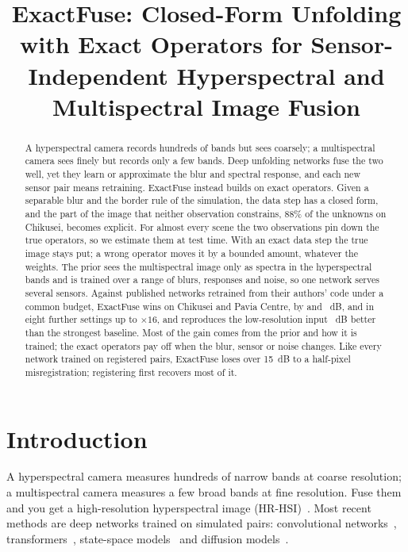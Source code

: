 \documentclass[10pt,twocolumn,letterpaper]{article}
\title{ExactFuse: Closed-Form Unfolding with Exact Operators for Sensor-Independent Hyperspectral and Multispectral Image Fusion}
\author{\cvprauthors}   %
\begin{document}
\maketitle


\begin{abstract}
A hyperspectral camera records hundreds of bands but sees coarsely; a multispectral camera sees finely but records only a few bands. Deep unfolding networks fuse the two well, yet they learn or approximate the blur and spectral response, and each new sensor pair means retraining. ExactFuse instead builds on exact operators. Given a separable blur and the border rule of the simulation, the data step has a closed form, and the part of the image that neither observation constrains, 88\% of the unknowns on Chikusei, becomes explicit. For almost every scene the two observations pin down the true operators, so we estimate them at test time. With an exact data step the true image stays put; a wrong operator moves it by a bounded amount, whatever the weights. The prior sees the multispectral image only as spectra in the hyperspectral bands and is trained over a range of blurs, responses and noise, so one network serves several sensors. Against  published networks retrained from their authors' code under a common budget, ExactFuse wins on Chikusei and Pavia Centre, by  and ~dB, and in eight further settings up to $\times16$, and reproduces the low-resolution input ~dB better than the strongest baseline. Most of the gain comes from the prior and how it is trained; the exact operators pay off when the blur, sensor or noise changes. Like every network trained on registered pairs, ExactFuse loses over 15~dB to a half-pixel misregistration; registering first recovers most of it.
\end{abstract}

\section{Introduction}
\label{sec:intro}
A hyperspectral camera measures hundreds of narrow bands at coarse resolution; a multispectral camera measures a few broad bands at fine resolution. Fuse them and you get a high-resolution hyperspectral image (HR-HSI)~\cite{vivone2025deep}. Most recent methods are deep networks trained on simulated pairs: convolutional networks~\cite{zhang2021ssrnet}, transformers~\cite{li2024mimformer,deng2023psrt,ma2024reciprocal}, state-space models~\cite{pei2026s3o} and diffusion models~\cite{chen2026twostage}.
\end{document}

